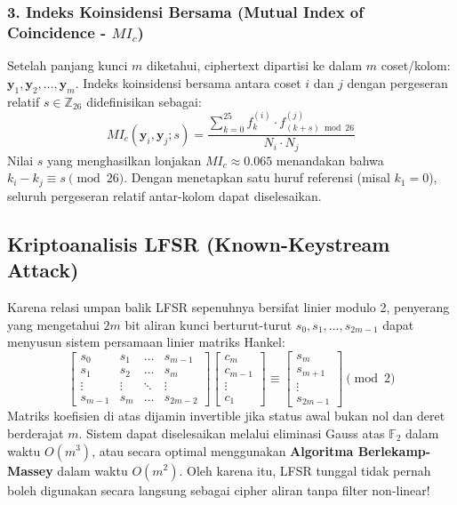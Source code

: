 \documentclass[11pt,a4paper]{article}
\begin{document}
\subsubsection{3. Indeks Koinsidensi Bersama (Mutual Index of Coincidence - $MI_c$)}
Setelah panjang kunci $m$ diketahui, ciphertext dipartisi ke dalam $m$ coset/kolom: $\mathbf{y}_1, \mathbf{y}_2, \dots, \mathbf{y}_m$. Indeks koinsidensi bersama antara coset $i$ dan $j$ dengan pergeseran relatif $s \in \mathbb{Z}_{26}$ didefinisikan sebagai:
\[
MI_c(\mathbf{y}_i, \mathbf{y}_j; s) = \frac{\sum_{k=0}^{25} f_k^{(i)} \cdot f_{(k + s) \bmod 26}^{(j)}}{N_i \cdot N_j}
\]
Nilai $s$ yang menghasilkan lonjakan $MI_c \approx 0.065$ menandakan bahwa $k_i - k_j \equiv s \pmod{26}$. Dengan menetapkan satu huruf referensi (misal $k_1 = 0$), seluruh pergeseran relatif antar-kolom dapat diselesaikan.

\subsection{Kriptoanalisis LFSR (Known-Keystream Attack)}
Karena relasi umpan balik LFSR sepenuhnya bersifat linier modulo 2, penyerang yang mengetahui $2m$ bit aliran kunci berturut-turut $s_0, s_1, \dots, s_{2m-1}$ dapat menyusun sistem persamaan linier matriks Hankel:
\[
\begin{bmatrix}
s_0 & s_1 & \dots & s_{m-1} \\
s_1 & s_2 & \dots & s_m \\
\vdots & \vdots & \ddots & \vdots \\
s_{m-1} & s_m & \dots & s_{2m-2}
\end{bmatrix}
\begin{bmatrix}
c_m \\ c_{m-1} \\ \vdots \\ c_1
\end{bmatrix}
\equiv
\begin{bmatrix}
s_m \\ s_{m+1} \\ \vdots \\ s_{2m-1}
\end{bmatrix} \pmod 2
\]
Matriks koefisien di atas dijamin invertible jika status awal bukan nol dan deret berderajat $m$. Sistem dapat diselesaikan melalui eliminasi Gauss atas $\mathbb{F}_2$ dalam waktu $O(m^3)$, atau secara optimal menggunakan \textbf{Algoritma Berlekamp-Massey} dalam waktu $O(m^2)$. Oleh karena itu, LFSR tunggal tidak pernah boleh digunakan secara langsung sebagai cipher aliran tanpa filter non-linear!
\end{document}
